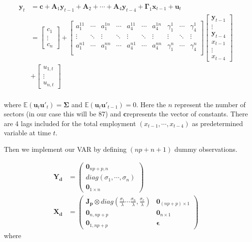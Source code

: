 \documentclass{monashthesis}
\begin{document}
\begin{align}
\boldsymbol{y}_t&=\boldsymbol{c}+\boldsymbol{A}_1 \boldsymbol{y}_{t-1}+\boldsymbol{A}_2+\cdots+\boldsymbol{A}_4\boldsymbol{y}_{t-4}+\boldsymbol{\Gamma}_1\boldsymbol{x}_{t-1}+\boldsymbol{u}_t\\
&=
\begin{bmatrix}
c_1\\
\vdots\\
c_n
\end{bmatrix}
+
\begin{bmatrix}
a_1^{11}&\cdots&a_1^{1n}&\cdots&a_4^{11}&\cdots&a_4^{1n}&\gamma_1^{1}&\cdots&\gamma_4^{1}\\
\vdots&\ddots&\vdots&\ddots&\vdots&\ddots&\vdots&\vdots&\ddots&\vdots\\
a_1^{n1}&\cdots&a_1^{nn}&\cdots&a_4^{n1}&\cdots&a_4^{nn}&\gamma_1^n&\cdots&\gamma_4^n\\
\end{bmatrix}
\begin{bmatrix}
\boldsymbol{y}_{t-1}\\
\vdots\\
\boldsymbol{y}_{t-4}\\
x_{t-1}\\
\vdots\\
x_{t-4}
\end{bmatrix}\\
&+
\begin{bmatrix}
u_{1,t}\\
\vdots\\
u_{n,t}
\end{bmatrix}\\
\end{align}

where \(\mathbb{E}(\boldsymbol{u}_t\boldsymbol{u}'_t)=\boldsymbol{\Sigma}\) and \(\mathbb{E}(\boldsymbol{u}_t\boldsymbol{u'}_{t-1})=0\). Here the \(n\) represent the number of sectors (in our case this will be 87) and \(\boldsymbol{c}\)represents the vector of constants. There are 4 lags included for the total employment \((x_{t-1},\cdots,x_{t-4})\) as predetermined variable at time \(t\).

Then we implement our VAR by defining \((np+n+1)\) dummy observations.

\[
\begin{aligned}
\boldsymbol{Y_d}&=
\begin{pmatrix}
\boldsymbol0_{np+p,n}\\
diag({\sigma_1,\cdots,\sigma_n})\\
\boldsymbol0_{1\times n}
\end{pmatrix}\\
\boldsymbol{X_d}&=
\begin{pmatrix}
\boldsymbol{J_p}\otimes diag(\frac{\sigma_1}{\lambda}\cdots\frac{\sigma_n}{\lambda},\frac{\sigma_e}{\lambda})&\boldsymbol0_{(np+p)\times1}\\
\boldsymbol 0_{n,np+p}&\boldsymbol 0_{n\times1}
\\
\boldsymbol 0_{1,np+p}&\boldsymbol{\epsilon}
\end{pmatrix}
\end{aligned}
\] where
\end{document}
